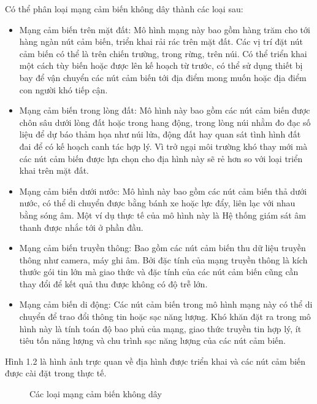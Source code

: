 Có thể phân loại mạng cảm biến không dây thành các loại sau:
\begin{itemize}
\item Mạng cảm biến trên mặt đất: Mô hình mạng này bao gồm hàng trăm cho tới hàng ngàn nút cảm biến, triển khai rải rác trên mặt đất. Các vị trí đặt nút cảm biến có thể là trên chiến trường, trong rừng, trên núi. Có thể triển khai một cách tùy biến hoặc được lên kế hoạch từ trước, có thể sử dụng thiết bị bay để vận chuyển các nút cảm biến tới địa điểm mong muốn hoặc địa điểm con người khó tiếp cận.
\item Mạng cảm biến trong lòng đất: Mô hình này bao gồm các nút cảm biến được chôn sâu dưới lòng đất hoặc trong hang động, trong lòng núi nhằm đo đạc số liệu để dự báo thảm họa như núi lửa, động đất hay quan sát tình hình đất đai để có kế hoạch canh tác hợp lý. Vì trở ngại môi trường khó thay mới mà các nút cảm biến được lựa chọn cho địa hình này sẽ rẻ hơn so với loại triển khai trên mặt đất. 
\item Mạng cảm biến dưới nước: Mô hình này bao gồm các nút cảm biến thả dưới nước, có thể di chuyển được bằng bánh xe hoặc lực đẩy, liên lạc với nhau bằng sóng âm. Một ví dụ thực tế của mô hình này là Hệ thống giám sát âm thanh được nhắc tới ở phần đầu.
\item Mạng cảm biến truyền thông: Bao gồm các nút cảm biến thu dữ liệu truyền thông như camera, máy ghi âm. Bởi đặc tính của mạng truyền thông là kích thước gói tin lớn mà giao thức và đặc tính của các nút cảm biến cũng cần thay đổi để kết quả thu được không có độ trễ lớn. 
\item Mạng cảm biến di động: Các nút cảm biến trong mô hình mạng này có thể di chuyển để trao đổi thông tin hoặc sạc năng lượng. Khó khăn đặt ra trong mô hình này là tính toán độ bao phủ của mạng, giao thức truyền tin hợp lý, ít tiêu tốn năng lượng và chu trình sạc năng lượng của các nút cảm biến.
\end{itemize}
 
Hình 1.2 là hình ảnh trực quan về địa hình được triển khai và các nút cảm biến được cài đặt trong thực tế.


\begin{figure}[htb]
	\caption{\label{fig:my-label} Các loại mạng cảm biến không dây}
\end{figure}

